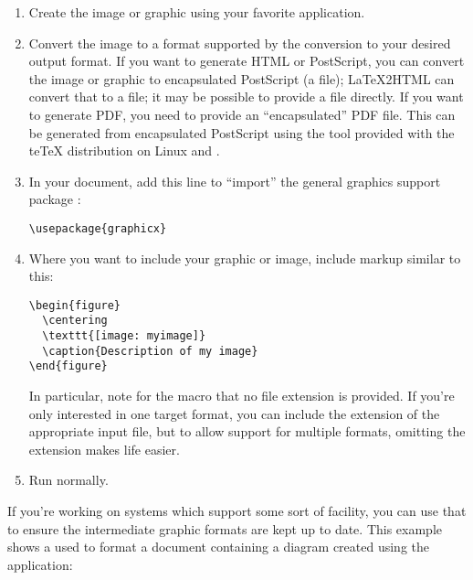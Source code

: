 \documentclass{howto}
\begin{document}
  \begin{enumerate}
    \item Create the image or graphic using your favorite
          application.

    \item Convert the image to a format supported by the conversion to
          your desired output format.  If you want to generate HTML or
          PostScript, you can convert the image or graphic to
          encapsulated PostScript (a  file); \LaTeX2HTML
          can convert that to a  file; it may be possible
          to provide a  file directly.  If you want to
          generate PDF, you need to provide an ``encapsulated'' PDF
          file.  This can be generated from encapsulated PostScript
          using the  tool provided with the te\TeX{}
          distribution on Linux and \UNIX.

    \item In your document, add this line to ``import'' the general
          graphics support package :

\begin{verbatim}
\usepackage{graphicx}
\end{verbatim}

    \item Where you want to include your graphic or image, include
          markup similar to this:

\begin{verbatim}
\begin{figure}
  \centering
  \texttt{[image: myimage]}
  \caption{Description of my image}
\end{figure}
\end{verbatim}

          In particular, note for the  macro
          that no file extension is provided.  If you're only
          interested in one target format, you can include the
          extension of the appropriate input file, but to allow
          support for multiple formats, omitting the extension makes
          life easier.

    \item Run  normally.
  \end{enumerate}

  If you're working on systems which support some sort of
   facility, you can use that to ensure the intermediate
  graphic formats are kept up to date.  This example shows a
   used to format a document containing a diagram
  created using the  application:
\end{document}
